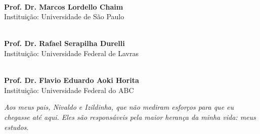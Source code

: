 \documentclass[
	12pt,				%
	oneside,			%
	a4paper,			%
	english,			%
	brazil				%
	]{abntex2ppgsi}
\begin{document}
\begin{folhadeaprovacao}
\begin{center}
\vspace*{2cm}

\
\vspace*{0.2cm} 
\\ \textbf{Prof. Dr. Marcos Lordello Chaim} 
\\ \vspace*{0.2cm} 
Instituição: Universidade de São Paulo

\vspace*{2cm}

\
\vspace*{0.2cm} 
\\ \textbf{Prof. Dr. Rafael Serapilha Durelli} 
\\ \vspace*{0.2cm} 
Instituição: Universidade Federal de Lavras

\vspace*{2cm}

\
\vspace*{0.2cm} 
\\ \textbf{Prof. Dr. Flavio Eduardo Aoki Horita} 
\\ \vspace*{0.2cm} 
Instituição: Universidade Federal do ABC

\end{center}
  
\end{folhadeaprovacao}

%
% 
\begin{dedicatoria}
   \vspace*{\fill}
   \centering
   \noindent
   \textit{Aos meus pais, Nivaldo e Izildinha, que não mediram esforços para que eu chegasse até aqui. Eles são responsáveis pela maior herança da minha vida: meus estudos.} 
	 \vspace*{\fill}
\end{dedicatoria}

%
% 
%
\end{document}
